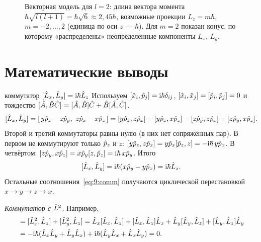 \begin{figure}[htbp]
\centering
{}
\caption{Векторная модель для $l=2$: длина вектора момента $\hbar\sqrt{l(l+1)}=\hbar\sqrt6\approx2{,}45\hbar$,
возможные проекции $L_z=m\hbar$, $m=-2,\dots,2$ (единица по оси $z$ — $\hbar$). Для $m=2$ показан конус,
по которому «распределены» неопределённые компоненты $L_x$, $L_y$.}
\label{fig:9:vector}
\end{figure}

\section{Математические выводы}

\begin{derivation}[label=der:9:comm]{коммутатор $[\hat{L}_x,\hat{L}_y]=\mathrm{i}\hbar\hat{L}_z$}
Используем $[\hat{x}_i,\hat{p}_j]=\mathrm{i}\hbar\delta_{ij}$, $[\hat{x}_i,\hat{x}_j]=[\hat{p}_i,\hat{p}_j]=0$ и тождество
$[\hat{A},\hat{B}\hat{C}]=[\hat{A},\hat{B}]\hat{C}+\hat{B}[\hat{A},\hat{C}]$.
\[
  [\hat{L}_x,\hat{L}_y]=[\,y\hat{p}_z-z\hat{p}_y,\ z\hat{p}_x-x\hat{p}_z\,]
  =[y\hat{p}_z,z\hat{p}_x]-[y\hat{p}_z,x\hat{p}_z]-[z\hat{p}_y,z\hat{p}_x]+[z\hat{p}_y,x\hat{p}_z].
\]
Второй и третий коммутаторы равны нулю (в них нет сопряжённых пар). В первом не коммутируют
только $\hat{p}_z$ и $z$: $[y\hat{p}_z,z\hat{p}_x]=y\hat{p}_x[\hat{p}_z,z]=-\mathrm{i}\hbar\,y\hat{p}_x$. В четвёртом:
$[z\hat{p}_y,x\hat{p}_z]=x\hat{p}_y[z,\hat{p}_z]=\mathrm{i}\hbar\,x\hat{p}_y$. Итого
\[
  [\hat{L}_x,\hat{L}_y]=\mathrm{i}\hbar(x\hat{p}_y-y\hat{p}_x)=\mathrm{i}\hbar\hat{L}_z .
\]
Остальные соотношения~\eqref{eq:9:comm} получаются циклической перестановкой $x\to y\to z\to x$.

\emph{Коммутатор с $\hat{L}^2$.} Например,
\begin{align*}
 [\op L^2,\op L_z]&=[\op L_x^2,\op L_z]+[\op L_y^2,\op L_z]
 =\op L_x[\op L_x,\op L_z]+[\op L_x,\op L_z]\op L_x+\op L_y[\op L_y,\op L_z]+[\op L_y,\op L_z]\op L_y\\
 &=-\ii\hbar(\op L_x\op L_y+\op L_y\op L_x)+\ii\hbar(\op L_y\op L_x+\op L_x\op L_y)=0 .
\end{align*}
\end{derivation}

